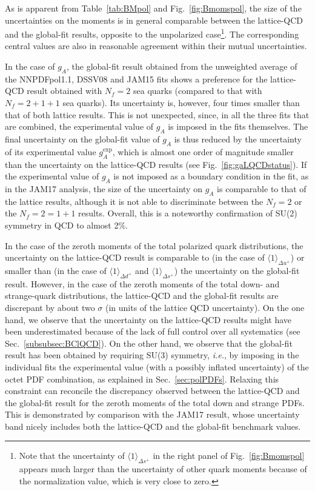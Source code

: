 As is apparent from Table~\ref{tab:BMpol} and Fig.~\ref{fig:Bmomspol}, the 
size of the uncertainties on the moments is in general comparable between the 
lattice-QCD and the global-fit results, opposite to the unpolarized 
case\footnote{Note that the uncertainty of 
$\langle 1 \rangle_{\Delta s^+}$ in the right panel of Fig.~\ref{fig:Bmomspol}
appears much larger than the uncertainty of other quark moments because
of the normalization value, which is very close to zero.}.
%
The corresponding central values are also in reasonable agreement within their
mutual uncertainties.

In the case of $g_A$, the global-fit result obtained from the unweighted 
average of the NNPDFpol1.1, DSSV08 and JAM15 fits shows a preference for the
lattice-QCD result obtained with $N_f=2$ sea quarks (compared to that with 
$N_f=2+1+1$ sea quarks).
%
Its uncertainty is, however, four times smaller than that of both lattice 
results.
%
This is not unexpected, since, in all the three fits that are combined, the 
experimental value of $g_A$ is imposed in the fits themselves.
%
The final uncertainty on the global-fit value of $g_A$ is thus reduced by 
the uncertainty of its experimental value $g_A^\text{exp}$, which is almost
one order of magnitude smaller than the uncertainty on the lattice-QCD results
(see Fig.~\ref{fig:gaLQCDstatus}).
%
If the experimental value of $g_A$ is not imposed as a boundary condition in 
the fit, as in the JAM17 analysis, the size of the uncertainty on $g_A$ is 
comparable to that of the lattice results, although it is not able to 
discriminate between the $N_f=2$ or the $N_f=2=1+1$ results.
%
Overall, this is a noteworthy confirmation of SU(2) symmetry in QCD to
almost 2\%.

In the case of the zeroth moments of the total polarized quark distributions,
the uncertainty on the lattice-QCD result is comparable to (in the case
of $\langle 1 \rangle_{\Delta u^+}$) or smaller than (in the case
of $\langle 1 \rangle_{\Delta d^+}$ and $\langle 1 \rangle_{\Delta s^+}$)
the uncertainty on the global-fit result.
%
However, in the case of the zeroth moments of the total down- and strange-quark 
distributions, the lattice-QCD and the global-fit results are discrepant
by about two $\sigma$ (in units of the
lattice QCD uncertainty).
%
On the one hand, we observe that the uncertainty on the lattice-QCD results 
might have been underestimated because of the lack of full control over
all systematics (see Sec.~\ref{subsubsec:BClQCD}).
%
On the other hand, we observe that the global-fit result has been obtained
by requiring SU(3) symmetry, {\it i.e.}, by imposing in the individual fits 
the experimental value (with a possibly inflated uncertainty) of the octet PDF 
combination, as explained in Sec.~\ref{sec:polPDFs}.
%
Relaxing this constraint can reconcile the discrepancy observed between 
the lattice-QCD and the global-fit result for the zeroth moments of the 
total down and strange PDFs.
%
This is demonstrated by comparison with the JAM17 result, whose uncertainty 
band nicely includes both the lattice-QCD and the global-fit benchmark values.

